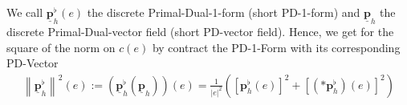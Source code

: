 \documentclass{scrartcl}
\newcommand{\pflh}{\mathbf{p}^{\flat}_{h}}
\newcommand{\PDpflh}{\underline{\mathbf{p}}^{\flat}_{h}}
\newcommand{\PDph}{\underline{\mathbf{p}}_{h}}
\begin{document}
    We call \( \PDpflh(e) \) the discrete Primal-Dual-1-form (short PD-1-form) and \( \PDph \) the discrete Primal-Dual-vector field
    (short PD-vector field).
    Hence, we get for the square of the norm on \( c(e) \) by contract the PD-1-Form with its corresponding PD-Vector
    \begin{align}
      \left\| \PDpflh \right\|^{2}(e) := \left( \PDpflh\left( \PDph \right) \right)(e)
                                       = \frac{1}{\left| e \right|^{2}}\left( \left[ \pflh(e) \right]^{2} 
                                                                             +\left[ \left(*\pflh\right)(e) \right]^{2}\right)
    \end{align}



  



\end{document}
